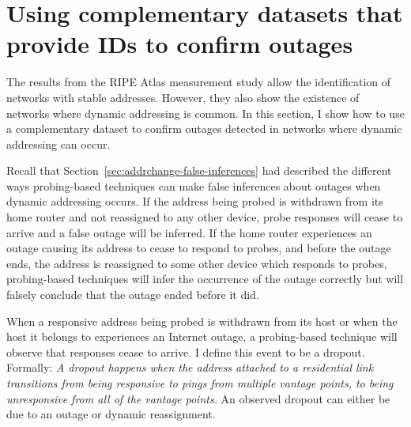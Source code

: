 

\section{Using complementary datasets that provide IDs to confirm outages}

\label{sec:complementary-ns}

The results from the RIPE Atlas measurement study allow the
identification of networks with stable addresses. However, they also
show the existence of networks where dynamic addressing is common. In
this section, I show how to use a complementary dataset to confirm
outages detected in networks where dynamic addressing can occur.


Recall that Section~\ref{sec:addrchange-false-inferences} had described the different ways probing-based techniques can make false inferences about outages when dynamic addressing occurs. If the address being probed is withdrawn from its home router and not reassigned to any other device, probe responses will cease to arrive and a false outage will be inferred. If the home router experiences an outage causing its address to cease to respond to probes, and before the outage ends, the address is reassigned to some other device which responds to probes, probing-based techniques will infer the occurrence of the outage correctly but will falsely conclude that the outage ended before it did.

When a responsive address being probed is withdrawn from its host or
when the host it belongs to experiences an Internet outage, a
probing-based technique will observe that responses cease to arrive. I
define this event to be a dropout. Formally: \emph{A dropout happens
when the address attached to a residential link transitions from being
responsive to pings from multiple vantage points, to being
unresponsive from all of the vantage points.} An observed dropout can
either be due to an outage or dynamic reassignment.


